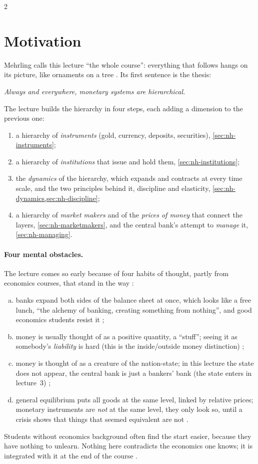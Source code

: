 \begin{paracol}{2}
\section*{Motivation}
Mehrling calls this lecture ``the whole course'': everything that follows hangs on its picture, like
ornaments on a tree . Its first sentence is the thesis:
\begin{center}
\emph{Always and everywhere, monetary systems are hierarchical.}
\end{center}
The lecture builds the hierarchy in four steps, each adding a dimension to the previous one:
\begin{enumerate}
  \item a hierarchy of \emph{instruments} (gold, currency, deposits, securities), \cref{sec:nh-instruments};
  \item a hierarchy of \emph{institutions} that issue and hold them, \cref{sec:nh-institutions};
  \item the \emph{dynamics} of the hierarchy, which expands and contracts at every time scale, and the two
        principles behind it, discipline and elasticity, \cref{sec:nh-dynamics,sec:nh-discipline};
  \item a hierarchy of \emph{market makers} and of the \emph{prices of money} that connect the layers,
        \cref{sec:nh-marketmakers}, and the central bank's attempt to \emph{manage} it, \cref{sec:nh-managing}.
\end{enumerate}

\paragraph{Four mental obstacles.} The lecture comes so early because of four habits of thought, partly from
economics courses, that stand in the way :
\begin{enumerate}[(a)]
  \item banks expand both sides of the balance sheet at once, which looks like a free lunch, ``the alchemy of
        banking, creating something from nothing'', and good economics students resist it ;
  \item money is usually thought of as a positive quantity, a ``stuff''; seeing it as somebody's
        \emph{liability} is hard (this is the inside/outside money distinction) ;
  \item money is thought of as a creature of the nation-state; in this lecture the state does not appear, the
        central bank is just a bankers' bank (the state enters in lecture~3) ;
  \item general equilibrium puts all goods at the same level, linked by relative prices; monetary instruments
        are \emph{not} at the same level, they only look so, until a crisis shows that things that seemed
        equivalent are not .
\end{enumerate}
Students without economics background often find the start easier, because they have nothing to unlearn.
Nothing here contradicts the economics one knows; it is integrated with it at the end of the course
.


\end{paracol}
